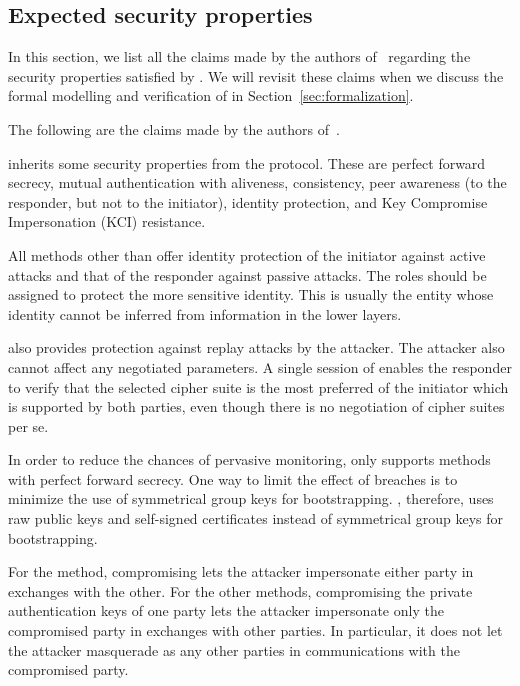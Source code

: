 {\subsection{Expected security properties}
In this section, we list all the claims made by the authors of~\cite{selander-lake-edhoc-01} regarding the security properties satisfied by \mEdhoc. We will revisit these claims when we discuss the formal modelling and verification of \mEdhoc{} in Section~\ref{sec:formalization}. 


The following are the claims made by the authors of~\cite{selander-lake-edhoc-01}. 

\mEdhoc{} inherits some security properties from the \mSigma{} protocol. These are perfect forward secrecy, mutual authentication with aliveness, consistency, peer awareness (to the responder, but not to the initiator), identity protection, and Key Compromise Impersonation (KCI) resistance.

All methods other than \mPskPsk{} offer identity protection of the initiator against active attacks and that of the responder against passive attacks. The roles should be assigned to protect the more sensitive identity. This is usually the entity whose identity cannot be inferred from information in the lower layers.

\mEdhoc{} also provides protection against replay attacks by the attacker. The attacker also cannot affect any negotiated parameters. A single session of \mEdhoc{} enables the responder to verify that the selected cipher suite is the most preferred of the initiator which is supported by both parties, even though there is no negotiation of cipher suites per se.

In order to reduce the chances of pervasive monitoring, \mEdhoc{} only supports methods with perfect forward secrecy. One way to limit the effect of breaches is to minimize the use of symmetrical group keys for bootstrapping. \mEdhoc, therefore, uses raw public keys and self-signed certificates instead of symmetrical group keys for bootstrapping.

For the \mPskPsk{} method, compromising \mPsk{} lets the attacker impersonate either party in \mEdhoc{} exchanges with the other. For the other methods, compromising the private authentication keys of one party lets the attacker impersonate only the compromised party in exchanges with other parties. In particular, it does not let the attacker masquerade as any other parties in communications with the compromised party. 

}

